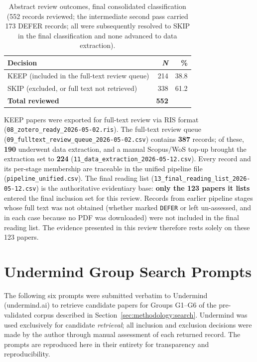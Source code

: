 \begin{table}[H]
\centering
\caption{Abstract review outcomes, final consolidated classification (552
records reviewed; the intermediate second pass carried 173 DEFER records; all
were subsequently resolved to SKIP in the final classification and none
advanced to data extraction).}
\label{tab:abstract}
\begin{tabular}{lrr}
\toprule
\textbf{Decision} & \textbf{\textit{N}} & \textbf{\%} \\
\midrule
KEEP (included in the full-text review queue)  & 214 & 38.8 \\
SKIP (excluded, or full text not retrieved)    & 338 & 61.2 \\
\midrule
\textbf{Total reviewed}                        & \textbf{552} & \\
\bottomrule
\end{tabular}
\end{table}

KEEP papers were exported for full-text review via RIS format
(\texttt{08\_zotero\_ready\_2026-05-02.ris}). The full-text review queue
(\texttt{09\_fulltext\_review\_queue\_2026-05-02.csv}) contains \textbf{387}
records; of these, \textbf{190} underwent data extraction, and a manual
Scopus/WoS top-up brought the extraction set to \textbf{224}
(\texttt{11\_data\_extraction\_2026-05-12.csv}). Every record and its
per-stage membership are traceable in the unified pipeline file
(\texttt{pipeline\_unified.csv}). The final reading list
(\texttt{13\_final\_reading\_list\_2026-05-12.csv}) is the authoritative
evidentiary base: \textbf{only the 123 papers it lists} entered the final
inclusion set for this review. Records from earlier pipeline stages whose full
text was not obtained (whether marked \texttt{DEFER} or left un-assessed, and
in each case because no PDF was downloaded) were not included in the final
reading list. The evidence presented in this review therefore rests solely on
these 123 papers.


\section[\appendixname~\thesection]{Undermind Group Search Prompts}
\label{app:undermind}

The following six prompts were submitted verbatim to Undermind (undermind.ai) to
retrieve candidate papers for Groups G1--G6 of the pre-validated corpus described in
Section~\ref{sec:methodology:search}. Undermind was used exclusively for candidate
\textit{retrieval}; all inclusion and exclusion decisions were made by the author
through manual assessment of each returned record. The prompts are reproduced here
in their entirety for transparency and reproducibility.

